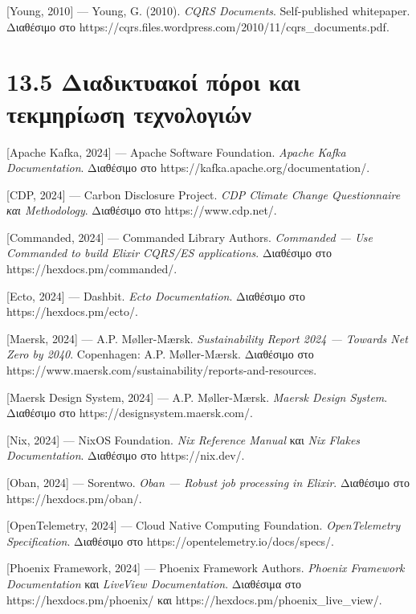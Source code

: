 {[}Young, 2010{]} --- Young, G. (2010). \emph{CQRS Documents}.
Self-published whitepaper. Διαθέσιμο στο
https://cqrs.files.wordpress.com/2010/11/cqrs\_documents.pdf.

\section{13.5 Διαδικτυακοί πόροι και τεκμηρίωση
τεχνολογιών}\label{ux3b4ux3b9ux3b1ux3b4ux3b9ux3baux3c4ux3c5ux3b1ux3baux3bfux3af-ux3c0ux3ccux3c1ux3bfux3b9-ux3baux3b1ux3b9-ux3c4ux3b5ux3baux3bcux3b7ux3c1ux3afux3c9ux3c3ux3b7-ux3c4ux3b5ux3c7ux3bdux3bfux3bbux3bfux3b3ux3b9ux3ceux3bd}

{[}Apache Kafka, 2024{]} --- Apache Software Foundation. \emph{Apache
Kafka Documentation}. Διαθέσιμο στο
https://kafka.apache.org/documentation/.

{[}CDP, 2024{]} --- Carbon Disclosure Project. \emph{CDP Climate Change
Questionnaire και Methodology}. Διαθέσιμο στο https://www.cdp.net/.

{[}Commanded, 2024{]} --- Commanded Library Authors. \emph{Commanded ---
Use Commanded to build Elixir CQRS/ES applications}. Διαθέσιμο στο
https://hexdocs.pm/commanded/.

{[}Ecto, 2024{]} --- Dashbit. \emph{Ecto Documentation}. Διαθέσιμο στο
https://hexdocs.pm/ecto/.

{[}Maersk, 2024{]} --- A.P. Møller-Mærsk. \emph{Sustainability Report
2024 --- Towards Net Zero by 2040}. Copenhagen: A.P. Møller-Mærsk.
Διαθέσιμο στο
https://www.maersk.com/sustainability/reports-and-resources.

{[}Maersk Design System, 2024{]} --- A.P. Møller-Mærsk. \emph{Maersk
Design System}. Διαθέσιμο στο https://designsystem.maersk.com/.

{[}Nix, 2024{]} --- NixOS Foundation. \emph{Nix Reference Manual} και
\emph{Nix Flakes Documentation}. Διαθέσιμο στο https://nix.dev/.

{[}Oban, 2024{]} --- Sorentwo. \emph{Oban --- Robust job processing in
Elixir}. Διαθέσιμο στο https://hexdocs.pm/oban/.

{[}OpenTelemetry, 2024{]} --- Cloud Native Computing Foundation.
\emph{OpenTelemetry Specification}. Διαθέσιμο στο
https://opentelemetry.io/docs/specs/.

{[}Phoenix Framework, 2024{]} --- Phoenix Framework Authors.
\emph{Phoenix Framework Documentation} και \emph{LiveView
Documentation}. Διαθέσιμα στο https://hexdocs.pm/phoenix/ και
https://hexdocs.pm/phoenix\_live\_view/.


